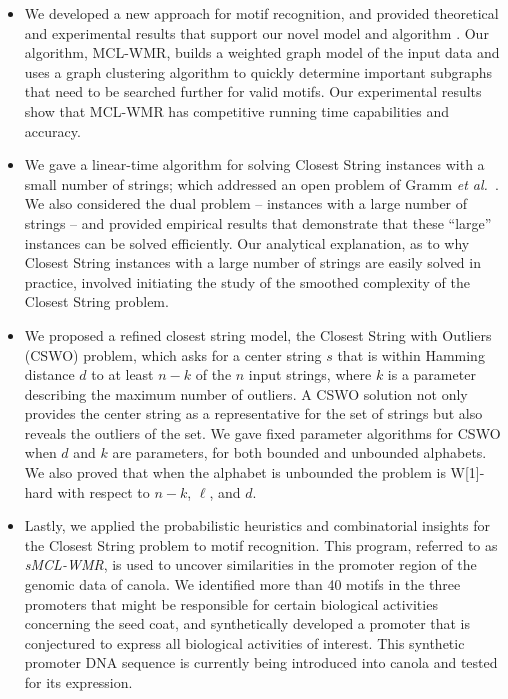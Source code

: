 \begin{itemize}
\item We developed a new approach for motif recognition, and provided theoretical and experimental results that support our novel model and algorithm \cite{boucher07}. Our algorithm, MCL-WMR, builds a weighted graph model of the input data and uses a graph clustering algorithm to quickly determine important subgraphs that need to be searched further for valid motifs. Our experimental results show that MCL-WMR has competitive running time capabilities and accuracy.  
\item We gave a linear-time algorithm for solving {\sc Closest String} instances with a small number of strings; which addressed an open problem of Gramm {\em et al.}\ \cite{GNR03}.  We also considered the dual problem -- instances with a large number of strings -- and provided empirical results that demonstrate that these ``large'' instances can be solved efficiently.  Our analytical explanation, as to why {\sc Closest String} instances with a large number of strings are easily solved in practice, involved initiating the study of the smoothed complexity of the {\sc Closest String} problem.  
\item We proposed a refined closest string model, the {\sc Closest String with Outliers} (CSWO) problem, which asks for a center string $s$ that is within Hamming distance $d$ to at least $n-k$ of the $n$ input strings, where $k$ is a parameter describing the maximum number of outliers. A CSWO solution not only provides the center string as a representative for the set of strings but also reveals the outliers of the set.  We gave fixed parameter algorithms for CSWO when $d$ and $k$ are parameters, for both bounded and unbounded alphabets. We also proved that when the alphabet is unbounded the problem is W[1]-hard with respect to $n-k$, $\ell$, and $d$.
\item  Lastly, we applied the probabilistic heuristics and combinatorial insights for the {\sc Closest String} problem to motif recognition.  This program, referred to as {\em sMCL-WMR}, is used to uncover similarities in the promoter region of the genomic data of canola.  We identified more than 40 motifs in the three promoters that might be responsible for certain biological activities concerning the seed coat, and synthetically developed a promoter that is conjectured to express all biological activities of interest. This synthetic promoter DNA sequence  is currently being introduced into canola and tested for its expression.
\end{itemize}

